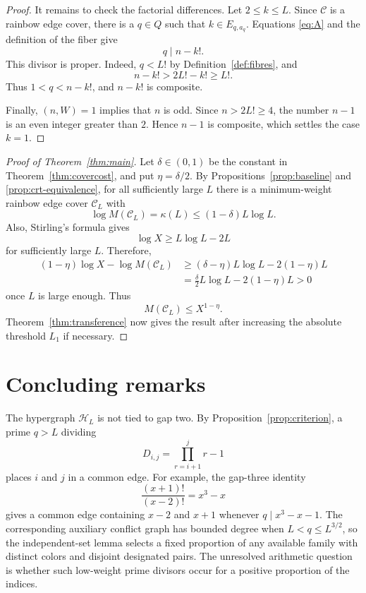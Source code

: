 \documentclass[11pt]{amsart}
\theoremstyle{definition}
\theoremstyle{remark}
\begin{document}
\begin{proof}
It remains to check the factorial differences.  Let $2\leq k\leq L$.
Since $\mathcal C$ is a rainbow edge cover, there is a $q\in Q$ such that
$k\in E_{q,a_q}$.  Equations \eqref{eq:A} and the definition of the fiber
give
\[
q\mid n-k!.
\]
This divisor is proper.  Indeed, $q<L!$ by Definition~\ref{def:fibres}, and
\[
n-k!>2L!-k!\geq L!.
\]
Thus $1<q<n-k!$, and $n-k!$ is composite.

Finally, $(n,W)=1$ implies that $n$ is odd.  Since $n>2L!\geq4$, the number
$n-1$ is an even integer greater than $2$.  Hence $n-1$ is composite, which
settles the case $k=1$.
\end{proof}

\begin{proof}[Proof of Theorem~\ref{thm:main}]
Let $\delta\in(0,1)$ be the constant in Theorem~\ref{thm:covercost}, and
put $\eta=\delta/2$.  By Propositions~\ref{prop:baseline} and
\ref{prop:crt-equivalence}, for all sufficiently large $L$ there is a
minimum-weight rainbow edge cover $\mathcal C_L$ with
\[
\log M(\mathcal C_L)=\kappa(L)
\leq(1-\delta)L\log L.
\]
Also, Stirling's formula gives
\[
\log X\geq L\log L-2L
\]
for sufficiently large $L$.  Therefore,
\begin{align*}
(1-\eta)\log X-\log M(\mathcal C_L)
&\geq(\delta-\eta)L\log L-2(1-\eta)L\\
&=\frac{\delta}{2}L\log L-2(1-\eta)L>0
\end{align*}
once $L$ is large enough.  Thus
\[
M(\mathcal C_L)\leq X^{1-\eta}.
\]
Theorem~\ref{thm:transference} now gives the result after increasing the
absolute threshold $L_1$ if necessary.
\end{proof}

\section{Concluding remarks}

The hypergraph $\mathcal H_L$ is not tied to gap two.  By
Proposition~\ref{prop:criterion}, a prime $q>L$ dividing
\[
D_{i,j}=\prod_{r=i+1}^{j}r-1
\]
places $i$ and $j$ in a common edge.  For example, the gap-three identity
\[
\frac{(x+1)!}{(x-2)!}=x^3-x
\]
gives a common edge containing $x-2$ and $x+1$ whenever
$q\mid x^3-x-1$.  The corresponding auxiliary conflict graph has bounded
degree when $L<q\leq L^{3/2}$, so the independent-set lemma selects a fixed
proportion of any available family with distinct colors and disjoint
designated pairs.  The unresolved arithmetic question is whether such
low-weight prime divisors occur for a positive proportion of the indices.
\end{document}
